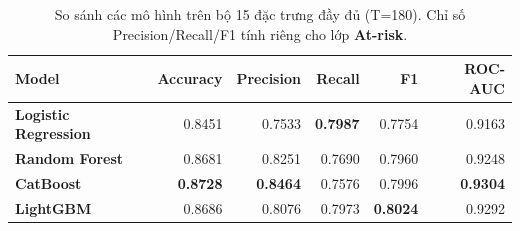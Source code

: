 \begin{table}[H]
  \centering
  \caption{So sánh các mô hình trên bộ 15 đặc trưng đầy đủ (T=180). Chỉ số Precision/Recall/F1 tính riêng cho lớp \textbf{At-risk}.}
  \label{tab:compare_full}
  \small
  \setlength{\tabcolsep}{5pt}
  \begin{tabular}{lrrrrr}
    \toprule
    \textbf{Model} & \textbf{Accuracy} & \textbf{Precision} & \textbf{Recall} & \textbf{F1} & \textbf{ROC-AUC} \\
    \midrule
    \textbf{Logistic Regression} & 0.8451 & 0.7533 & \textbf{0.7987} & 0.7754 & 0.9163 \\
    \textbf{Random Forest} & 0.8681 & 0.8251 & 0.7690 & 0.7960 & 0.9248 \\
    \textbf{CatBoost} & \textbf{0.8728} & \textbf{0.8464} & 0.7576 & 0.7996 & \textbf{0.9304} \\
    \textbf{LightGBM} & 0.8686 & 0.8076 & 0.7973 & \textbf{0.8024} & 0.9292 \\
    \bottomrule
  \end{tabular}
\end{table}
